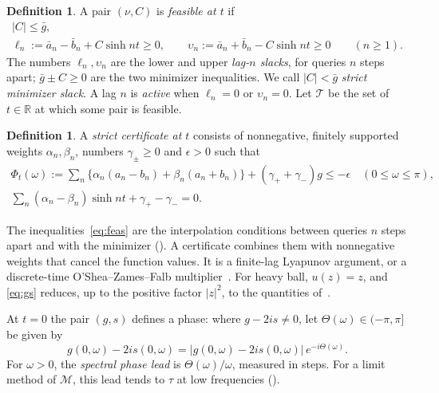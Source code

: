 \documentclass[11pt]{article}
\theoremstyle{definition}
\newtheorem{definition}[theorem]{Definition}
\theoremstyle{remark}
\newcommand{\R}{\mathbb R}
\newcommand{\cM}{\mathcal M}
\newcommand{\cT}{\mathcal T}
\newcommand{\sh}{\sinh}
\begin{document}
\begin{definition}\label{def:feas}
A pair \((\nu,C)\) is \emph{feasible at \(t\)} if
\begin{equation}\label{eq:feas}
\begin{gathered}
|C|\le\bar g,\\
\ell_n:=\bar a_n-\bar b_n+C\sh nt\ge0,\qquad
\upsilon_n:=\bar a_n+\bar b_n-C\sh nt\ge0\qquad(n\ge1).
\end{gathered}
\end{equation}
The numbers \(\ell_n,\upsilon_n\) are the lower and upper \emph{lag-\(n\) slacks},
for queries \(n\) steps apart; \(\bar g\pm C\ge0\) are the two minimizer inequalities.
We call \(|C|<\bar g\) \emph{strict minimizer slack}.
A lag \(n\) is \emph{active} when \(\ell_n=0\) or \(\upsilon_n=0\).
Let \(\cT\) be the set of \(t\in\R\) at which some pair is feasible.
\end{definition}

\begin{definition}\label{def:cert}
A \emph{strict certificate at \(t\)} consists of nonnegative, finitely
supported weights \(\alpha_n,\beta_n\), numbers \(\gamma_\pm\ge0\) and
\(\epsilon>0\) such that
\begin{equation}\label{eq:cert}
\begin{gathered}
\Phi_t(\omega):=\sum_n\bigl\{\alpha_n(a_n-b_n)+\beta_n(a_n+b_n)\bigr\}+(\gamma_++\gamma_-)g\le-\epsilon\quad(0\le\omega\le\pi),\\
\sum_n(\alpha_n-\beta_n)\sh nt+\gamma_+-\gamma_-=0.
\end{gathered}
\end{equation}
\end{definition}

The inequalities~\eqref{eq:feas} are the interpolation conditions between
queries \(n\) steps apart and with the minimizer ().
A certificate combines them with nonnegative weights that cancel the function
values.  It is a finite-lag Lyapunov argument, or a discrete-time
O'Shea--Zames--Falb multiplier~\cite{OY67,ZF68,WB68,TA}.  For heavy ball, \(u(z)=z\), and
\eqref{eq:gs} reduces, up to the positive factor \(|z|^2\), to the
quantities of~\cite[eq.~(12) and Definition~2.4]{TA}.

At \(t=0\) the pair \((g,s)\) defines a phase: where \(g-2is\ne0\), let \(\Theta(\omega)\in(-\pi,\pi]\) be given by
\begin{equation}\label{eq:Theta}
g(0,\omega)-2is(0,\omega)=\bigl|g(0,\omega)-2is(0,\omega)\bigr|\,e^{-i\Theta(\omega)} .
\end{equation}
For \(\omega>0\), the \emph{spectral phase lead} is \(\Theta(\omega)/\omega\), measured in steps.
For a limit method of \(\cM\), this lead tends to \(\tau\) at low frequencies
().
\end{document}
